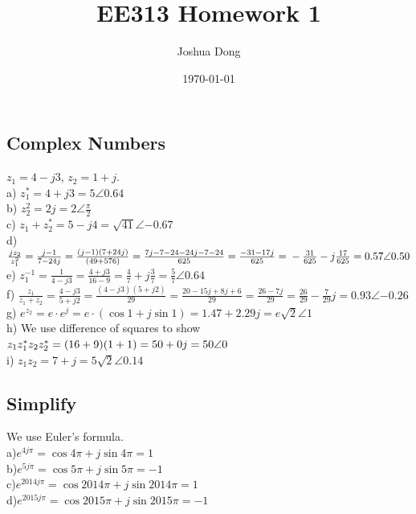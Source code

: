 \documentclass{article}
\begin{document}
\title{EE313\: Homework 1}
\author{Joshua Dong}
\date{\today}
\maketitle

\subsection{Complex Numbers}
$z_1 = 4-j3$, $z_2 = 1+j$.
\\a) $z^*_1 = 4+j3 = 5\angle{0.64}$
\\b) $z^2_2 = 2j = 2\angle{\frac{\pi}{2}}$
\\c) $z_1 + z^*_2 = 5-j4 = \sqrt{41}\angle{-0.67}$
\\d) $\frac{jz_2}{z^2_1} = \frac{j-1}{7-24j} =
\frac{(j-1)(7+24j)}{(49+576)} = \frac{7j-7-24-24j-7-24}{625} =
\frac{-31-17j}{625} =
\\-\frac{31}{625}-j\frac{17}{625} = 0.57\angle{0.50}$
\\e) $z^{-1}_1 = \frac{1}{4-j3} = \frac{4+j3}{16-9} =
\frac{4}{7}+j\frac{3}{7} = \frac{5}{7}\angle{0.64}$
\\f) $\frac{z_1}{z_1+z_2} = \frac{4-j3}{5+j2} =
\frac{(4-j3)(5+j2)}{29} = \frac{20-15j+8j+6}{29} =
\frac{26-7j}{29} = \frac{26}{29} - \frac{7}{29}j = 0.93\angle{-0.26}$
\\g) $e^{z_2} = e \cdot e^{j} = e \cdot (\cos{1}+j\sin{1}) =
1.47+2.29j = e\sqrt{2} \angle 1$
\\h) We use difference of squares to show
$z_1z^*_1z_2z^*_2 = (16+9)(1+1) =
\\50+0j = 50 \angle 0$
\\i) $z_1z_2 = 7+j = 5\sqrt2\angle{0.14}$

\subsection{Simplify}
We use Euler's formula.
\\a)$e^{4j\pi} = \cos{4\pi}+j\sin{4\pi} = 1$
\\b)$e^{5j\pi} = \cos{5\pi}+j\sin{5\pi} = -1$
\\c)$e^{2014j\pi} = \cos{2014\pi}+j\sin{2014\pi} = 1$
\\d)$e^{2015j\pi} = \cos{2015\pi}+j\sin{2015\pi} = -1$
\end{document}
